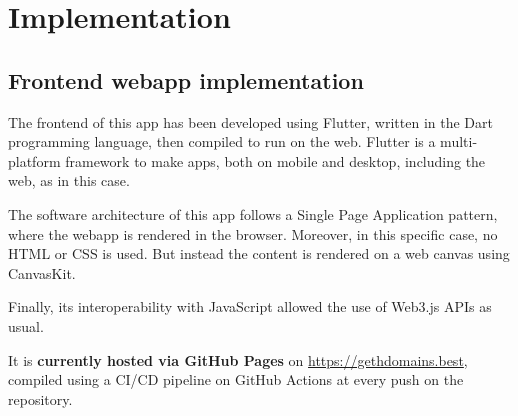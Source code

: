 \documentclass[main.tex]{subfiles}
\begin{document}
\section{Implementation}\label{sec:implementation}

\subsection{Frontend webapp implementation}
The frontend of this app has been developed using Flutter, written in the Dart programming language, then compiled to run on the web.
Flutter is a multi-platform framework to make apps, both on mobile and desktop, including the web, as in this case.

The software architecture of this app follows a Single Page Application pattern, where the webapp is rendered in the browser. Moreover, in this specific case, no HTML or CSS is used. But instead the content is rendered on a web canvas using CanvasKit.

Finally, its interoperability with JavaScript allowed the use of Web3.js APIs as usual.

It is \textbf{currently hosted via GitHub Pages} on \href{https://gethdomains.best}{https://gethdomains.best}, compiled using a CI/CD pipeline on GitHub Actions at every push on the repository.
\end{document}
